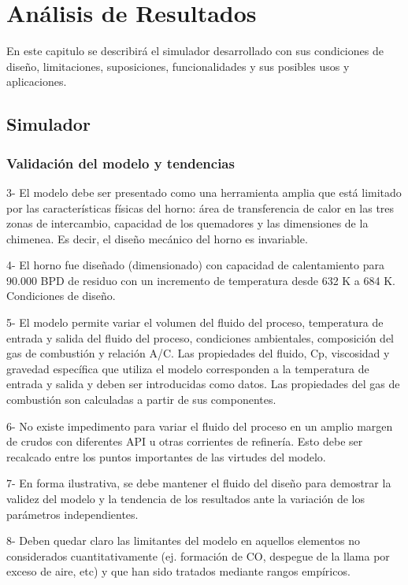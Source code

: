 \chapter{Análisis de Resultados}

\par En este capitulo se describirá el simulador desarrollado con sus condiciones de diseño, limitaciones, suposiciones, funcionalidades y sus posibles usos y aplicaciones. 

\section{Simulador}

\subsection{Validación del modelo y tendencias}

3-      El modelo debe ser presentado como una herramienta amplia que está limitado por las características físicas del horno: área de transferencia de calor en las tres zonas de intercambio, capacidad de los quemadores y las dimensiones de la chimenea. Es decir, el diseño mecánico del horno es invariable.

4-      El horno   fue diseñado (dimensionado)  con capacidad de calentamiento para 90.000 BPD de residuo  con un incremento de temperatura desde  632 K a 684 K. Condiciones de diseño.

5-      El modelo permite variar el volumen del fluido del proceso, temperatura de entrada y salida del fluido del proceso, condiciones ambientales, composición del gas de combustión y relación A/C. Las propiedades del fluido, Cp, viscosidad y gravedad específica que utiliza el modelo corresponden a la temperatura de entrada y salida y deben ser introducidas como datos. Las propiedades del gas de combustión son calculadas a partir de sus componentes.

6-      No existe impedimento para variar el fluido del proceso en un amplio margen de crudos con diferentes API u otras corrientes de refinería. Esto debe ser recalcado entre los puntos importantes de las virtudes del modelo.

7-      En forma ilustrativa, se debe mantener el fluido del diseño para demostrar la validez del modelo y  la tendencia de los resultados ante la variación de los parámetros independientes.

8-      Deben quedar claro las limitantes del modelo en aquellos elementos no considerados cuantitativamente (ej. formación de CO, despegue de la llama por exceso de aire, etc) y que han sido tratados mediante rangos empíricos.

